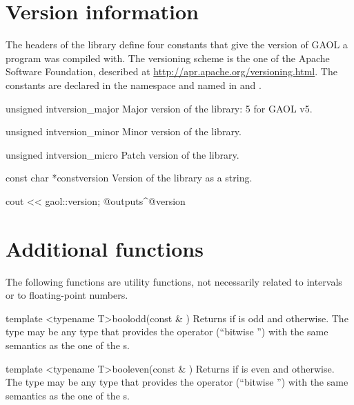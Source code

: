 \documentclass[12pt,a4paper,twoside,openright]{book}
\begin{document}
\section{Version information}\label{sec:version}
%

The headers of the library define four constants that give the version of
GAOL a program was compiled with. The
versioning scheme is the one of the Apache Software Foundation, described at
\url{http://apr.apache.org/versioning.html}. The constants are declared in the namespace  and named in
 and .\newinvfive

\begin{defconst}{unsigned int}{version\_major}
  Major version of the library: 5 for GAOL v5.
\end{defconst}

\begin{defconst}{unsigned int}{version\_minor}
  Minor version of the library.
\end{defconst}

\begin{defconst}{unsigned int}{version\_micro}
  Patch version of the library.
\end{defconst}

\begin{defconst}{const char *const}{version}
  Version of the library as a string.
\begin{example}
cout << gaol::version;
@outputs^@version~
\end{example}
\end{defconst}

\section{Additional functions}\label{sec:additional-functions}

The following functions are utility functions, not necessarily related to
intervals or to floating-point numbers.

\begin{defTfun}{template <typename T>}{bool}{odd}{(const \& )}
  Returns  if  is odd and  otherwise. The type
   may be any type that provides the operator \code{\&} (``bitwise
  '') with the same semantics as the one of the s.
\end{defTfun}

\begin{defTfun}{template <typename T>}{bool}{even}{(const \& )}
  Returns  if  is even and  otherwise. The type
   may be any type that provides the operator \code{\&} (``bitwise
  '') with the same semantics as the one of the s.
\end{defTfun}
\end{document}
